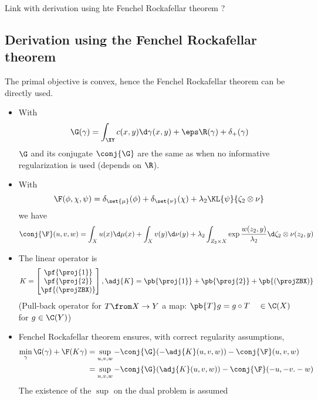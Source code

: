 \documentclass[11pt,a4paper]{article}
\begin{document}
Link with derivation using hte Fenchel Rockafellar theorem ?


\subsection{Derivation using the Fenchel Rockafellar theorem}

The primal objective is convex, hence the Fenchel Rockafellar theorem can be directly used.
\begin{itemize}
\item With \begin{equation}\G(\gamma) = \int_{\XY} c(x,y) \d \gamma(x,y) + \eps
    \R(\gamma) + \delta_{+}(\gamma)\end{equation}
    $\G$ and its conjugate
    $\conj{\G}$ are the same as when no informative regularization is used (depends on $\R$).

    \item
        With
        \begin{equation}
            \F(\phi, \chi, \psi) = \delta_{\set{\mu}}(\phi) + \delta_{\set{\nu}}(\chi) + \lambda_2 \KL{\psi}{\zeta_2 \otimes \nu}
        \end{equation}
        we have
        \begin{equation}
        \conj{\F}(u, v, w) = \int_{X}u(x) \d \mu(x) + \int_{X} v(y) \d \nu(y) + \lambda_2 \int_{Z_2 \times X} \exp{\frac{w(z_2,y)}{\lambda_2}}\d \zeta_2 \otimes \nu (z_2, y)
    \end{equation}

\item The linear operator is
    \begin{equation}
        K = \begin{bmatrix}
            \pf{\proj{1}} \\
            \pf{\proj{2}} \\
            \pf{(\projZBX)}
        \end{bmatrix},
    \adj{K} = \pb{\proj{1}} + \pb{\proj{2}} + \pb{(\projZBX)}
    \end{equation}
    (Pull-back operator for $T\from X \to Y$ a map: $\pb{T}g = g \circ T \quad \in \C(X)$ for $g \in \C(Y)$)

\item
    Fenchel Rockafellar theorem ensures, with correct regularity assumptions,
    \begin{align}
        \min_{\gamma} \G(\gamma) + \F(K\gamma) &= \sup_{u, v, w} - \conj{\G}(-\adj{K}(u, v, w)) - \conj{\F}(u, v, w)\\
        &= \sup_{u, v, w} - \conj{\G}(\adj{K}(u, v, w)) - \conj{\F}(-u, -v. -w)\\
    \end{align}
    The existence of the $\sup$ on the dual problem is assumed
    \end{itemize}
\end{document}
